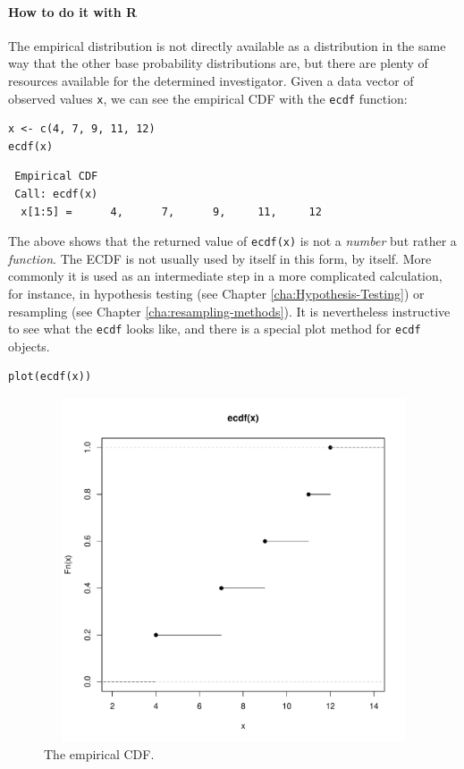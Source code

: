 \documentclass[captions=tableheading]{scrbook}
\begin{document}
\paragraph*{How to do it with \textsf{R}}

The empirical distribution is not directly available as a distribution in the same way that the other base probability distributions are, but there are plenty of resources available for the determined investigator.  Given a data vector of observed values \texttt{x}, we can see the empirical CDF with the \texttt{ecdf} function:


\begin{verbatim}
x <- c(4, 7, 9, 11, 12)
ecdf(x)
\end{verbatim}

\begin{verbatim}
 Empirical CDF 
 Call: ecdf(x)
  x[1:5] =      4,      7,      9,     11,     12
\end{verbatim}

The above shows that the returned value of \texttt{ecdf(x)} is not a \emph{number} but rather a \emph{function}. The ECDF is not usually used by itself in this form, by itself. More commonly it is used as an intermediate step in a more complicated calculation, for instance, in hypothesis testing (see Chapter \ref{cha:Hypothesis-Testing}) or resampling (see Chapter \ref{cha:resampling-methods}). It is nevertheless instructive to see what the \texttt{ecdf} looks like, and there is a special plot method for \texttt{ecdf} objects.



\begin{verbatim}
plot(ecdf(x))
\end{verbatim}



\begin{figure}[H]
    \includegraphics[width=5in, height=4in]{img/empirical-CDF.pdf}
    \caption[The empirical CDF]{\small The empirical CDF.}
    \label{fig:empirical-CDF}
  \end{figure}
\end{document}
